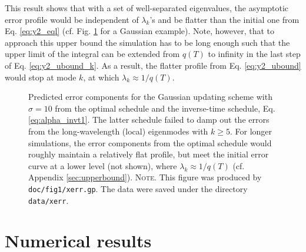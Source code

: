 \documentclass[reprint, floatfix]{revtex4-1}
\newcommand{\note}[1]{{\color{DarkGreen}\footnotesize \textsc{Note.} #1}}
\begin{document}
This result shows that with a set of well-separated eigenvalues,
the asymptotic error profile would be
independent of $\lambda_k$'s and
be flatter than the initial one from
Eq. \eqref{eq:y2_eql}
(cf. Fig. \ref{fig:xerr}
for a Gaussian example).
%
Note, however, that to approach this upper bound
the simulation has to be long enough
such that the upper limit of the integral
can be extended from $q(T)$ to infinity
in the last step of Eq. \eqref{eq:y2_ubound_k}.
%
As a result,
the flatter profile from Eq. \eqref{eq:y2_ubound}
would stop at mode $k$,
at which $\lambda_k \approx 1/q(T)$.

\begin{figure}[h]
\begin{center}
  \caption{
    \label{fig:xerr}
    Predicted error components for the Gaussian updating scheme
    with $\sigma = 10$
    from the optimal schedule
    and the inverse-time schedule, Eq. \eqref{eq:alpha_invt1}.
    The latter schedule failed to damp out the errors
    from the long-wavelength (local) eigenmodes
    with $k \ge 5$.
    For longer simulations,
    the error components from the optimal schedule
    would roughly maintain a relatively flat profile,
    but meet the initial error curve
    at a lower level (not shown),
    where $\lambda_k \approx 1/q(T)$
    (cf. Appendix \ref{sec:upperbound}).
    \note{This figure was produced by \texttt{doc/fig1/xerr.gp}.
      The data were saved under the directory \texttt{data/xerr}.
    }%
  }
\end{center}
\end{figure}




\section{\label{sec:results}
Numerical results}
\end{document}
